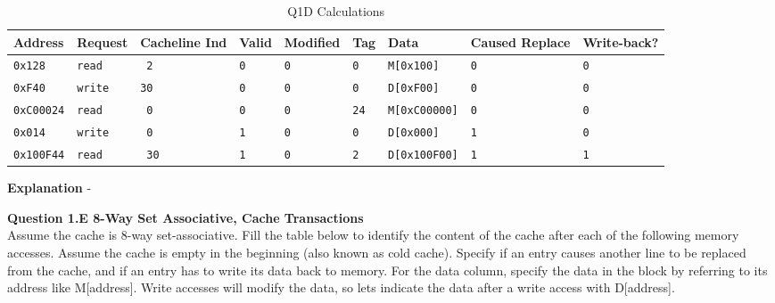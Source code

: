 \documentclass[a4paper,11pt]{article}
\newcommand{\T}{\texttt}
\begin{document}
\begin{table}[H]
\caption{Q1D Calculations} \label{tab:q1calc} 
\begin{center}
\begin{tabular}{| l | l | l | l | l | l | l | l | l |}
\hline
Address       & Request    & Cacheline Ind & Valid  & Modified  & Tag    & Data            & Caused Replace  & Write-back?    \\ \hline
\T{0x128}     &  \T{read}  & \T{ 2 }       & \T{0}  & \T{0}     & \T{0}  & \T{M[0x100]}    &      \T{0}      & \T{0}    \\ \hline
\T{0xF40}     &  \T{write} & \T{30 }       & \T{0}  & \T{0}     & \T{0}  & \T{D[0xF00]}    &      \T{0}      & \T{0}    \\ \hline
\T{0xC00024}  &  \T{read}  & \T{ 0 }       & \T{0}  & \T{0}     & \T{24} & \T{M[0xC00000]} &      \T{0}      & \T{0}    \\ \hline
\T{0x014}     &  \T{write} & \T{ 0 }       & \T{1}  & \T{0}     & \T{0}  & \T{D[0x000]}    &      \T{1}      & \T{0}    \\ \hline
\T{0x100F44}  &  \T{read}  & \T{ 30}       & \T{1}  & \T{0}     & \T{2}  & \T{D[0x100F00]} &      \T{1}      & \T{1}    \\ \hline
\end{tabular}
\end{center}
\end{table}

\textbf{Explanation} - 


\item \textbf{Question 1.E 8-Way Set Associative, Cache Transactions } \\
Assume the cache is 8-way set-associative. Fill the table below to identify the content of the cache after each of the following memory accesses. Assume the cache is empty in the beginning (also known as cold cache). Specify if an entry causes another line to be replaced from the cache, and if an entry has to write its data back to memory. For the data column, specify the data in the block by referring to its address like M[address]. Write accesses will modify the data, so lets indicate the data after a write access with D[address].
\end{document}
